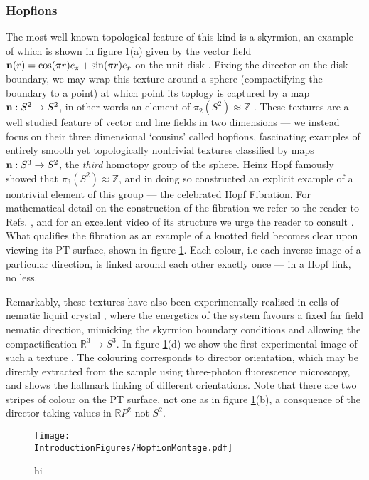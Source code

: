 \subsubsection{Hopfions}
The most well known topological feature of this kind is a skyrmion, an example of which is shown in figure \ref{fig:HopfionMontage}(a) given by the vector field ${\bf n}(r) = \cos(\pi r) e_z + \sin(\pi r)e_r$ on the unit disk \cite{GarethBook}. Fixing the director on the disk boundary, we may wrap this texture around a sphere (compactifying the boundary to a point) at which point its toplogy is captured by a map ${\bf n} : S^2 \rightarrow S^2$, in other words an element of $\pi_2 (S^2)\approx \mathbb{Z}$
. These textures are a well studied feature of vector and line fields in two dimensions --- we instead focus on their three dimensional `cousins' called hopfions, fascinating examples of entirely smooth yet topologically nontrivial textures classified by maps ${\bf n} : S^3 \rightarrow S^2$, the \emph{third} homotopy group of the sphere. Heinz Hopf famously showed that $\pi_3(S^2) \approx \mathbb{Z}$, and in doing so constructed an explicit example of a nontrivial element of this group --- the celebrated Hopf Fibration. For mathematical detail on the construction of the fibration we refer to the reader to Refs. \cite{GarethBook BottTu}, and for an excellent video of its structure we urge the reader to consult \cite{Niles}. What qualifies the fibration as an example of a knotted field becomes clear upon viewing its PT surface, shown in figure \ref{fig:HopfionMontage}. Each colour, i.e each inverse image of a particular direction, is linked around each other exactly once --- in a Hopf link, no less. 

Remarkably, these textures have also been experimentally realised in cells of nematic liquid crystal \cite{Chen,Akcerman,Torons}, where the energetics of the system favours a fixed far field nematic direction, mimicking the skyrmion boundary conditions and allowing the compactification $\mathbb{R}^3\rightarrow {S}^3$. In figure \ref{fig:HopfionMontage}(d) we show the first experimental image of such a texture \cite{Chen}. The colouring corresponds to director orientation, which may be directly extracted from the sample using three-photon fluorescence microscopy, and shows the hallmark linking of different orientations. Note that there are two stripes of colour on the PT surface, not one as in figure \ref{fig:HopfionMontage}(b), a consquence of the director taking values in $\mathbb{R}P^2$ not $S^2$.
\begin{figure}[htbp]
\centering
\texttt{[image: \\IntroductionFigures/HopfionMontage.pdf]}
\caption{hi }
\label{fig:HopfionMontage}
\end{figure}
